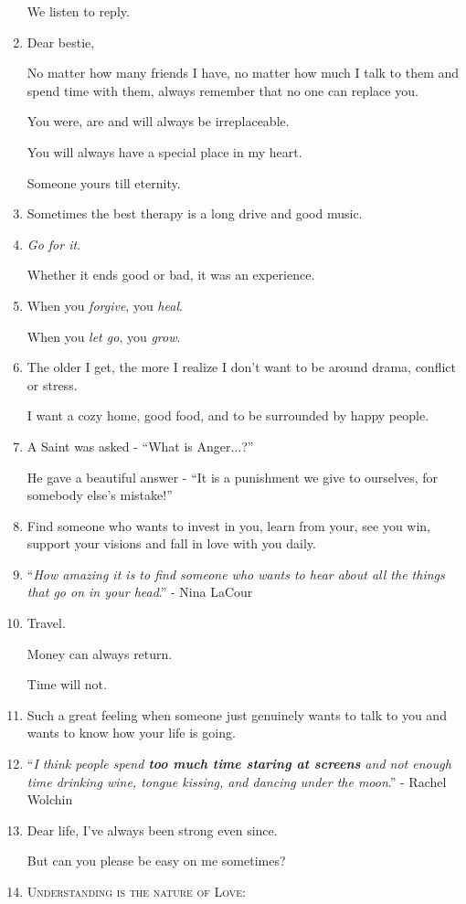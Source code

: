\documentclass{article}
\begin{document}
\begin{enumerate}
	We listen to reply.
	\item Dear bestie,
	
	No matter how many friends I have, no matter how much I talk to them and spend time with them, always remember that no one can replace you.
	
	You were, are and will always be irreplaceable.
	
	You will always have a special place in my heart.
	
	Someone yours till eternity.
	\item Sometimes the best therapy is a long drive and good music.
	\item \textit{Go for it}.
	
	Whether it ends good or bad, it was an experience.
	\item When you \textit{forgive}, you \textit{heal}.
	
	When you \textit{let go}, you \textit{grow}.
	\item The older I get, the more I realize I don't want to be around drama, conflict or stress.
	
	I want a cozy home, good food, and to be surrounded by happy people.
	\item A Saint was asked - ``What is Anger$\ldots$?''
	
	He gave a beautiful answer - ``It is a punishment we give to ourselves, for somebody else's mistake!''
	\item Find someone who wants to invest in you, learn from your, see you win, support your visions and fall in love with you daily.
	\item ``\textit{How amazing it is to find someone who wants to hear about all the things that go on in your head}.'' - Nina LaCour
	\item Travel.
	
	Money can always return.
	
	Time will not.
	\item Such a great feeling when someone just genuinely wants to talk to you and wants to know how your life is going.
	\item ``\textit{I think people spend \textbf{too much time staring at screens} and not enough time drinking wine, tongue kissing, and dancing under the moon}.'' - Rachel Wolchin
	\item Dear life, I've always been strong even since.
	
	But can you please be easy on me sometimes?
	\item \textsc{Understanding is the nature of Love}:
	

\end{enumerate}
\end{document}
